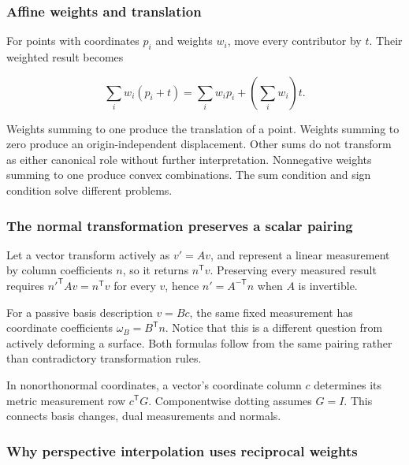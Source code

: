 \subsubsection{Affine weights and translation}\label{02-foundations-ii-ch039-affine-weights-and-translation}

\hypertarget{02-foundations-ii-ch039-affine-weights-and-translation}{}

For points with coordinates \(p_i\) and weights \(w_i\), move every contributor by \(t\). Their weighted result becomes

\[
\sum_iw_i(p_i+t)=\sum_iw_ip_i+\left(\sum_iw_i\right)t.
\]

Weights summing to one produce the translation of a point. Weights summing to zero produce an origin-independent displacement. Other sums do not transform as either canonical role without further interpretation. Nonnegative weights summing to one produce convex combinations. The sum condition and sign condition solve different problems.

\subsubsection{The normal transformation preserves a scalar pairing}\label{02-foundations-ii-ch039-the-normal-transformation-preserves-a-scalar-pairing}

\hypertarget{02-foundations-ii-ch039-the-normal-transformation-preserves-a-scalar-pairing}{}

Let a vector transform actively as \(v'=Av\), and represent a linear measurement by column coefficients \(n\), so it returns \(n^\mathsf Tv\). Preserving every measured result requires \(n'^\mathsf TAv=n^\mathsf Tv\) for every \(v\), hence \(n'=A^{-\mathsf T}n\) when \(A\) is invertible.

For a passive basis description \(v=Bc\), the same fixed measurement has coordinate coefficients \(\omega_B=B^\mathsf Tn\). Notice that this is a different question from actively deforming a surface. Both formulas follow from the same pairing rather than contradictory transformation rules.

In nonorthonormal coordinates, a vector's coordinate column \(c\) determines its metric measurement row \(c^\mathsf TG\). Componentwise dotting assumes \(G=I\). This connects basis changes, dual measurements and normals.

\subsubsection{Why perspective interpolation uses reciprocal weights}\label{02-foundations-ii-ch039-why-perspective-interpolation-uses-reciprocal-weights}

